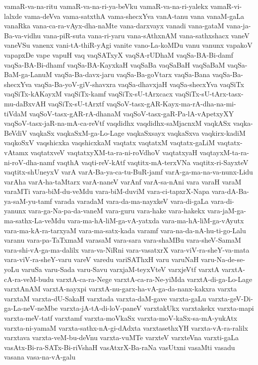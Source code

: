 {vamaR-va-na-ritu
vamaR-va-na-ri-ya-beVku
vamaR-va-na-ri-yalekx
vamaR-vi-lalxde
vama-deVva
vama-satxthA
vama-shecxYva
vanA-tanu
vana
vanaM-gaLa
vanaRka
vana-ca-ra-vAyx-dha-naMte
vana-darxvayx
vanadi
vana-gataM
vana-ja-Ba-va-vidhu
vana-piR-suta
vana-ri-yaru
vana-sAthxnAM
vana-sathxshacx
vaneV
vaneVSu
vanenx
vani-tA-thiR-yAgi
vanite
vano-La-koMDu
vanu
vanunx
vapakoV
vapapxDe
vape
vapuH
vaq
vaqSATxyX
vaqSA-rUDhaM
vaqSa-BA-Bi-damf
vaqSa-BA-Bi-dhamf
vaqSa-BA-KayxkaH
vaqSaBa
vaqSaBaH
vaqSaBaM
vaqSa-BaM-ga-LanuM
vaqSa-Ba-davx-jaru
vaqSa-Ba-goVtarx
vaqSa-Bana
vaqSa-Ba-shecxYva
vaqSa-Ba-yoV-giV-shavxra
vaqSa-dhavxjaH
vaqSa-shecxYva
vaqSiTx
vaqSiTx-kAKayxM
vaqSiTx-kamf
vaqSiTx-sU-tArxcacx
vaqSiTx-sU-tArx-tasx-mu-daBxvAH
vaqSiTx-sU-tArxtf
vaqSoV-tasx-gAR-Kayx-ma-rA-dha-na-mi-tiVdaM
vaqSoV-tasx-gAR-rA-dhanaM
vaqSoV-tasx-gaR-Pa-lA-vApetxyXY
vaqSoV-tasx-jaR-na-mA-ca-reVtf
vaqdidhx
vaqdidhx-saMjacnxM
vaqkASx
vaqka-BeVdiV
vaqkaSx
vaqkaSxM-ga-Lo-Lage
vaqkaSxsayx
vaqkaSxva
vaqkirx-kadiM
vaqkoSxV
vaqshicxka
vaqshicxkaM
vaqtatx
vaqtatxM
vaqtatx-gaLiM
vaqtatx-vAtamx
vaqtatxveV
vaqtatxyXM-ta-ra-ni-roVdhoV
vaqtatxyaH
vaqtayxM-ta-ra-ni-roV-dha-namf
vaqthA
vaqti-reV-kAtf
vaqtitx-mA-terxVNa
vaqtitx-ri-SayxteV
vaqtitx-shUneyxV
varA
varA-Ba-ya-ca-tu-BuR-jamf
varA-ga-ma-na-va-nunx-Lidu
varAha
varA-ha-taMtarx
varA-naneV
varAnf
varA-sa-nAni
vara
varaH
varaM
varaMTi
vara-biM-du-veMdu
vara-biM-duviM
vara-ci-tapxrX-Napa
vara-dA-Ba-ya-saM-yu-tamf
varada
varadaM
vara-da-ma-nayxkeV
vara-di-gaLa
vara-di-yanunx
vara-ga-Na-pa-da-vaneM
vara-guru
vara-hake
vara-hakekx
vara-jaM-ga-ma-sathx-La-veMdu
vara-ma-hA-liM-ga-vA-yatxda
vara-ma-hA-liM-ga-vAyutx
vara-ma-kA-ra-tarxyaM
vara-ma-satx-kada
varamf
vara-na-da-nA-hu-ti-go-Lalu
varanu
vara-pa-TaTxmaM
varasaM
vara-sara
vara-shaMBu
vara-sheV-SamaM
vara-shi-vA-ga-ma-dalilx
vara-va-NiRni
vara-vasatxrX
vara-viV-ra-sheY-va-mata
vara-viV-ra-sheY-varu
vareV
varedu
variSAThxH
varu
varuNaH
varu-Na-de-se-yoLu
varuSa
varu-Sada
varu-Savu
varxjaM-teyxVteV
varxjeVtf
varxtA
varxtA-cA-ra-veM-budu
varxtA-ca-ra-Nege
varxtA-ca-ra-Ne-yiMda
varxtA-di-ga-Lo-Lage
varxtAnAM
varxtA-nayxpi
varxtA-nu-garx-ha-vA-ga-da-nanx-kakxra
varxta
varxtaM
varxta-dU-SakaH
varxtada
varxta-daM-gave
varxta-gaLu
varxta-geV-Di-ga-La-neV-neMbe
varxta-jA-tA-di-loV-paneV
varxtakUkx
varxtakekx
varxta-mapi
varxta-meV-tatf
varxtamf
varxta-moVkaSx
varxta-moV-kaSx-sa-mA-yukAtx
varxta-ni-yamaM
varxta-sathx-nA-gi-dAdxta
varxtasethxYH
varxta-vA-ra-ralilx
varxtava
varxta-veM-bu-deVnu
varxta-vuMTe
varxteV
varxteVna
varxti-gaLa
vasAtx-Bi-ra-SATx-Bi-riVshaH
vasAtxrX-Ba-raNa
vasUtxni
vasaMti
vasadu
vasana
vasa-na-vA-galu
}

